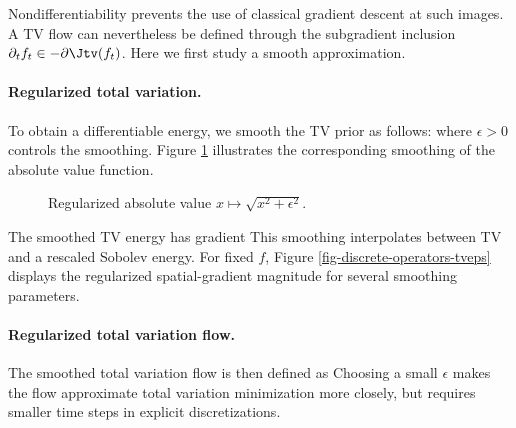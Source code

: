 Nondifferentiability prevents the use of classical gradient descent at such images. A TV flow can nevertheless be defined through the subgradient inclusion $\partial_t f_t\in-\partial\Jtv(f_t)$. Here we first study a smooth approximation.

  
\paragraph{Regularized total variation.}
	
To obtain a differentiable energy, we smooth the TV prior as follows:
where $\epsilon>0$ controls the smoothing. Figure \ref{fig-regul-abs} illustrates the corresponding smoothing of the absolute value function.


\begin{figure}[tbp]
\centering
{}\hfill
{}
\caption{Regularized absolute value $x \mapsto \sqrt{x^2+\epsilon^2}$.}
\label{fig-regul-abs}
\end{figure}

The smoothed TV energy has gradient
This smoothing interpolates between TV and a rescaled Sobolev energy. For fixed $f$,
Figure \ref{fig-discrete-operators-tveps} displays the regularized spatial-gradient magnitude for several smoothing parameters.



  
\paragraph{Regularized total variation flow.}

The smoothed total variation flow is then defined as
Choosing a small $\epsilon$ makes the flow approximate total variation minimization more closely, but requires smaller time steps in explicit discretizations.

